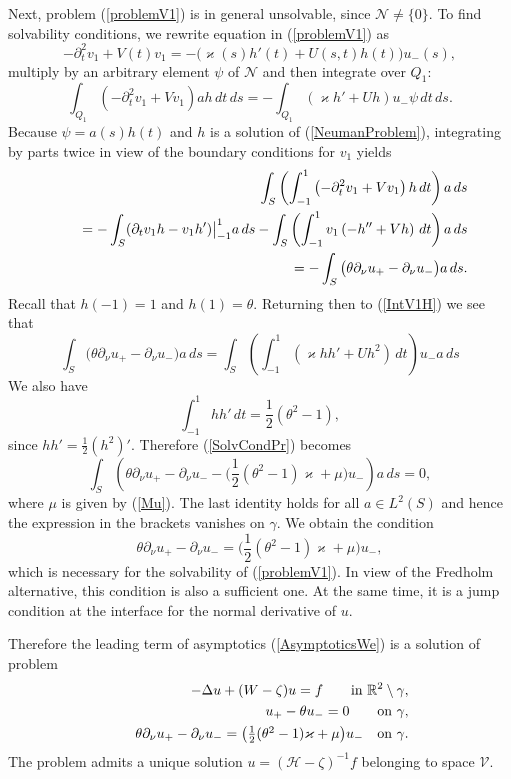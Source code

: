 \documentclass[graybox]{svmult}
\renewcommand{\kappa}{\varkappa}
\newcommand{\Real}{\mathbb R}
\newcommand{\eqref}[1]{(\ref{#1})}
\newcommand{\pte}{\partial_t}
\begin{document}
Next, problem \eqref{problemV1} is in general unsolvable, since $\mathcal{N}\neq\{0\}$.  To find solvabi\-li\-ty conditions, we rewrite  equation in \eqref{problemV1} as
\begin{equation}\label{eqnV1Expand}
  -\pte^2 v_1+V(t)v_1=-\big(\kappa(s)h'(t)+U(s,t)h(t)\big)u_-(s),
\end{equation}
multiply  by an arbitrary element $\psi$ of  $\mathcal{N}$  and then integrate over $Q_1$:
\begin{equation}\label{IntV1H}
\int_{Q_1}\left(-\pte^2 v_1+Vv_1\right)ah\,dt\,ds=
-\int_{Q_1}(\kappa h'+Uh )u_-\psi\, dt\,ds.
\end{equation}
Because $\psi=a(s)h(t)$ and $h$ is a solution of \eqref{NeumanProblem}, integrating by parts twice  in view of the boundary conditions for $v_1$ yields
\begin{eqnarray}\nonumber
&&\int_{S} \left(\int_{-1}^1\left(-\pte^2 v_1+Vv_1\right)h\,dt \right) a\,ds\\\nonumber
&&\kern12pt=-\int_{S}( \partial_tv_1 h-v_1 h')\big|_{-1}^1a\,ds-
\int_{S} \left(\int_{-1}^1 v_1\left(-h''+Vh\right)\,dt \right) a\,ds\\\nonumber
&&\kern12pt=-\int_{S}\big(\theta\partial_\nu u_+-\partial_\nu u_-\big) a\,ds.
\end{eqnarray}
Recall that $h(-1)=1$ and $h(1)=\theta$. Returning then to \eqref{IntV1H} we see that
\begin{equation}\label{SolvCondPr}
\int_{S}\big(\theta\partial_\nu u_+-\partial_\nu u_-\big) a\,ds=
\int_{S} \left(\int_{-1}^1 \left(\kappa hh'+Uh^2\right)\,dt \right) u_-a\,ds
\end{equation}
We also have
$$
  \int_{-1}^1hh'\,d t=\textstyle\frac{1}{2 }(\theta^2-1),
$$
since $hh'=\frac12 (h^2)'$. Therefore \eqref{SolvCondPr} becomes
$$
\int_{S}\left(\theta\partial_\nu u_+-\partial_\nu u_--\big(\textstyle\frac{1}{2}(\theta^2-1)\kappa+\mu \big)u_-\right)a\,ds= 0,
$$
where $\mu$ is given by \eqref{Mu}.
The last identity holds for all $a\in L^2(S)$ and hence  the expression in the brackets vanishes on $\gamma$. We obtain  the  condition
$$
  \theta\partial_\nu u_+-\partial_\nu u_-
=\big(\textstyle\frac{1}{2}(\theta^2-1)\kappa+\mu \big) u_-,
$$
which is necessary for the solvability of \eqref{problemV1}.
In view of the Fredholm alternative, this condition is also a sufficient one. At the same time, it is a jump condition at the interface for the normal derivative of $u$.

Therefore the leading term of asymptotics \eqref{AsymptoticsWe} is a solution of problem
\begin{eqnarray}\label{LimitProblemEq}
&&-\Delta u+(W-\zeta)u=f \qquad \hbox{in  } \Real^2\setminus \gamma,
\\ \label{RCond0}
 &&\phantom{-}u_+-\theta u_-=0  \qquad \hbox{on } \gamma,
\\ \label{RCond1}
&&\phantom{-}\theta\partial_\nu u_+-\partial_\nu u_-
=\big(\textstyle\frac{1}{2}(\theta^2-1)\kappa+\mu \big) u_- \quad \hbox{on } \gamma.
\end{eqnarray}
The problem admits a unique solution $u=(\mathcal{H}-\zeta)^{-1}f$ belonging to space $\mathcal{V}$.
\end{document}
